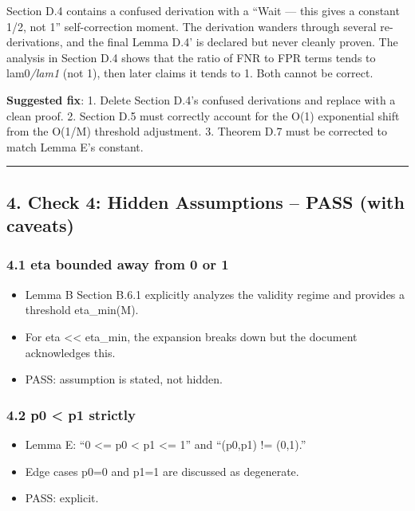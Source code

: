\documentclass[
  12pt,
]{ctexart}
\providecommand{\tightlist}{%
  \setlength{\itemsep}{0pt}\setlength{\parskip}{0pt}}
\begin{document}
Section D.4 contains a confused derivation with a ``Wait --- this gives
a constant 1/2, not 1'' self-correction moment. The derivation wanders
through several re-derivations, and the final Lemma D.4' is declared but
never cleanly proven. The analysis in Section D.4 shows that the ratio
of FNR to FPR terms tends to lam0\emph{/\textbar lam1}\textbar{} (not
1), then later claims it tends to 1. Both cannot be correct.

\textbf{Suggested fix}: 1. Delete Section D.4's confused derivations and
replace with a clean proof. 2. Section D.5 must correctly account for
the O(1) exponential shift from the O(1/M) threshold adjustment. 3.
Theorem D.7 must be corrected to match Lemma E's constant.

\begin{center}\rule{0.5\linewidth}{0.5pt}\end{center}

\subsection{4. Check 4: Hidden Assumptions -- PASS (with
caveats)}\label{check-4-hidden-assumptions-pass-with-caveats}

\subsubsection{4.1 eta bounded away from 0 or
1}\label{eta-bounded-away-from-0-or-1}

\begin{itemize}
\tightlist
\item
  Lemma B Section B.6.1 explicitly analyzes the validity regime and
  provides a threshold eta\_min(M).
\item
  For eta \textless\textless{} eta\_min, the expansion breaks down but
  the document acknowledges this.
\item
  PASS: assumption is stated, not hidden.
\end{itemize}

\subsubsection{4.2 p0 \textless{} p1 strictly}\label{p0-p1-strictly}

\begin{itemize}
\tightlist
\item
  Lemma E: ``0 \textless= p0 \textless{} p1 \textless= 1'' and ``(p0,p1)
  != (0,1).''
\item
  Edge cases p0=0 and p1=1 are discussed as degenerate.
\item
  PASS: explicit.
\end{itemize}
\end{document}
